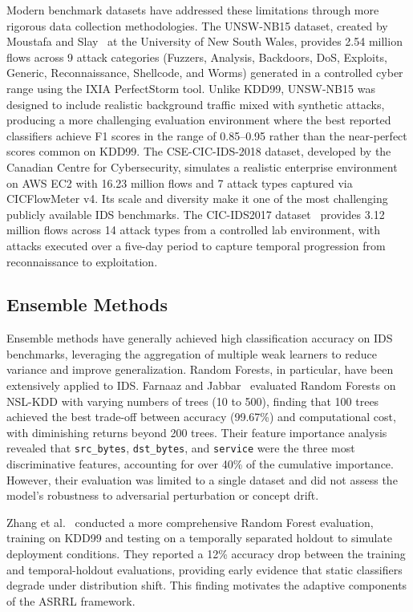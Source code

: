 \documentclass[12pt, letterpaper, oneside]{report}
\newcommand{\ASRRL}{\textsc{ASRRL}}
\begin{document}
Modern benchmark datasets have addressed these limitations through more rigorous data collection methodologies. The UNSW-NB15 dataset, created by Moustafa and Slay~\citep{moustafa2015} at the University of New South Wales, provides 2.54 million flows across 9 attack categories (Fuzzers, Analysis, Backdoors, DoS, Exploits, Generic, Reconnaissance, Shellcode, and Worms) generated in a controlled cyber range using the IXIA PerfectStorm tool. Unlike KDD99, UNSW-NB15 was designed to include realistic background traffic mixed with synthetic attacks, producing a more challenging evaluation environment where the best reported classifiers achieve F1 scores in the range of 0.85--0.95 rather than the near-perfect scores common on KDD99. The CSE-CIC-IDS-2018 dataset, developed by the Canadian Centre for Cybersecurity, simulates a realistic enterprise environment on AWS EC2 with 16.23 million flows and 7 attack types captured via CICFlowMeter v4. Its scale and diversity make it one of the most challenging publicly available IDS benchmarks. The CIC-IDS2017 dataset~\citep{sharafaldin2018} provides 3.12 million flows across 14 attack types from a controlled lab environment, with attacks executed over a five-day period to capture temporal progression from reconnaissance to exploitation.

\subsection{Ensemble Methods}

Ensemble methods have generally achieved high classification accuracy on IDS benchmarks, leveraging the aggregation of multiple weak learners to reduce variance and improve generalization. Random Forests, in particular, have been extensively applied to IDS. Farnaaz and Jabbar~\citep{farnaaz2016} evaluated Random Forests on NSL-KDD with varying numbers of trees (10 to 500), finding that 100 trees achieved the best trade-off between accuracy (99.67\%) and computational cost, with diminishing returns beyond 200 trees. Their feature importance analysis revealed that \texttt{src\_bytes}, \texttt{dst\_bytes}, and \texttt{service} were the three most discriminative features, accounting for over 40\% of the cumulative importance. However, their evaluation was limited to a single dataset and did not assess the model's robustness to adversarial perturbation or concept drift.

Zhang et al.~\citep{zhang2008random} conducted a more comprehensive Random Forest evaluation, training on KDD99 and testing on a temporally separated holdout to simulate deployment conditions. They reported a 12\% accuracy drop between the training and temporal-holdout evaluations, providing early evidence that static classifiers degrade under distribution shift. This finding motivates the adaptive components of the \ASRRL{} framework.
\end{document}
